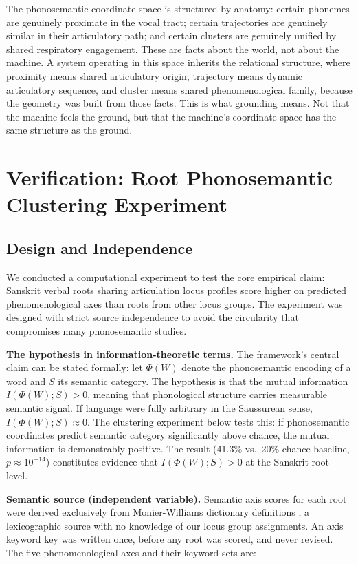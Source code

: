 \documentclass[12pt]{article}
\begin{document}
The phonosemantic coordinate space is structured by anatomy: certain phonemes are genuinely proximate in the vocal tract; certain trajectories are genuinely similar in their articulatory path; and certain clusters are genuinely unified by shared respiratory engagement. These are facts about the world, not about the machine. A system operating in this space inherits the relational structure, where proximity means shared articulatory origin, trajectory means dynamic articulatory sequence, and cluster means shared phenomenological family, because the geometry was built from those facts. This is what grounding means. Not that the machine feels the ground, but that the machine's coordinate space has the same structure as the ground.


\section{Verification: Root Phonosemantic Clustering Experiment}

\subsection{Design and Independence}

We conducted a computational experiment to test the core empirical claim: Sanskrit verbal roots sharing articulation locus profiles score higher on predicted phenomenological axes than roots from other locus groups. The experiment was designed with strict source independence to avoid the circularity that compromises many phonosemantic studies.

\textbf{The hypothesis in information-theoretic terms.} The framework's central claim can be stated formally: let $\Phi(W)$ denote the phonosemantic encoding of a word and $S$ its semantic category. The hypothesis is that the mutual information $I(\Phi(W); S) > 0$, meaning that phonological structure carries measurable semantic signal. If language were fully arbitrary in the Saussurean sense, $I(\Phi(W); S) \approx 0$. The clustering experiment below tests this: if phonosemantic coordinates predict semantic category significantly above chance, the mutual information is demonstrably positive. The result (41.3\% vs.~20\% chance baseline, $p \approx 10^{-14}$) constitutes evidence that $I(\Phi(W); S) > 0$ at the Sanskrit root level.

\textbf{Semantic source (independent variable).} Semantic axis scores for each root were derived exclusively from Monier-Williams dictionary definitions \citep{monierw1899}, a lexicographic source with no knowledge of our locus group assignments. An axis keyword key was written once, before any root was scored, and never revised. The five phenomenological axes and their keyword sets are:
\end{document}

